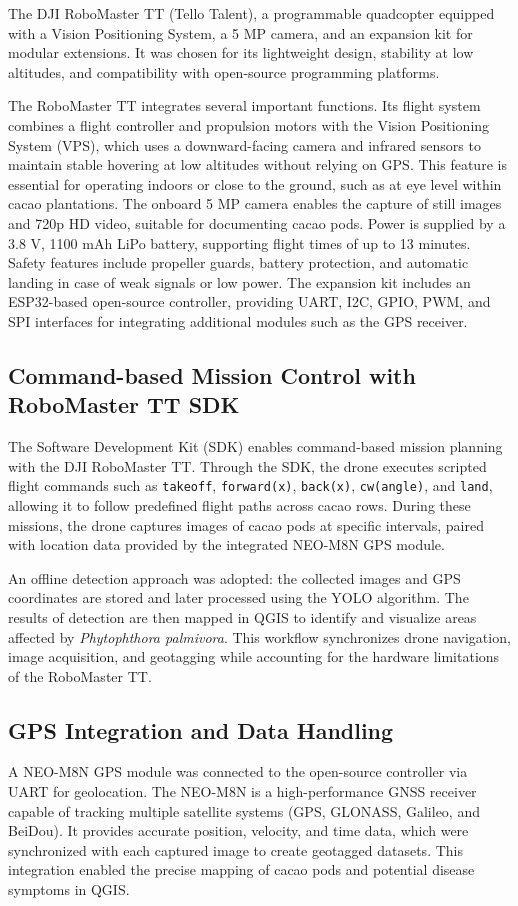 	The DJI RoboMaster TT (Tello Talent), a programmable quadcopter 
	equipped with a Vision Positioning System, a 5 MP camera, and an expansion kit for modular extensions. 
	It was chosen for its lightweight design, stability at low altitudes, and compatibility with open-source 
	programming platforms. 
	
	The RoboMaster TT integrates several important functions. Its flight system combines a flight controller 
	and propulsion motors with the Vision Positioning System (VPS), which uses a downward-facing camera and 
	infrared sensors to maintain stable hovering at low altitudes without relying on GPS. This feature is 
	essential for operating indoors or close to the ground, such as at eye level within cacao plantations. 
	The onboard 5 MP camera enables the capture of still images and 720p HD video, suitable for documenting 
	cacao pods. Power is supplied by a 3.8 V, 1100 mAh LiPo battery, supporting flight times of up to 
	13 minutes. Safety features include propeller guards, battery protection, and automatic landing in case 
	of weak signals or low power. The expansion kit includes an ESP32-based open-source controller, providing 
	UART, I2C, GPIO, PWM, and SPI interfaces for integrating additional modules such as the GPS receiver.
	
	\subsection{Command-based Mission Control with RoboMaster TT SDK}
	The Software Development Kit (SDK) enables command-based mission planning with the 
	DJI RoboMaster TT. Through the SDK, the drone executes scripted flight commands such as 
	\texttt{takeoff}, \texttt{forward(x)}, \texttt{back(x)}, \texttt{cw(angle)}, and \texttt{land}, 
	allowing it to follow predefined flight paths across cacao rows. During these missions, the drone 
	captures images of cacao pods at specific intervals, paired with location data provided by the 
	integrated NEO-M8N GPS module.  
	
	An offline detection approach was adopted: the collected images and GPS coordinates are stored 
	and later processed using the YOLO algorithm. The results of detection are then mapped in QGIS 
	to identify and visualize areas affected by \textit{Phytophthora palmivora}. This workflow 
	synchronizes drone navigation, image acquisition, and geotagging while accounting for the 
	hardware limitations of the RoboMaster TT.
	
	\subsection{GPS Integration and Data Handling}
	A NEO-M8N GPS module was connected to the open-source controller via UART for geolocation. 
	The NEO-M8N is a high-performance GNSS receiver capable of tracking multiple satellite systems 
	(GPS, GLONASS, Galileo, and BeiDou). It provides accurate position, velocity, and time data, 
	which were synchronized with each captured image to create geotagged datasets. This integration 
	enabled the precise mapping of cacao pods and potential disease symptoms in QGIS.  
	

